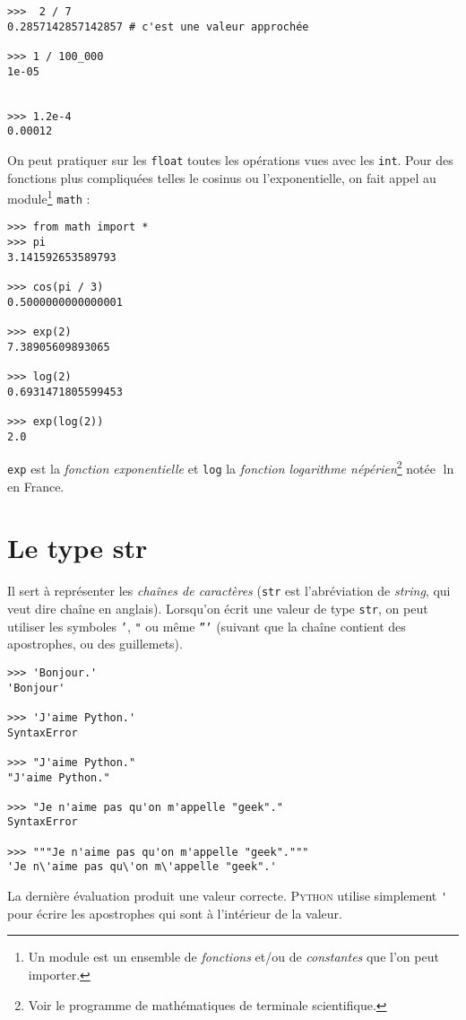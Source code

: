 \begin{pys}\begin{verbatim}
>>>  2 / 7
0.2857142857142857 # c'est une valeur approchée

>>> 1 / 100_000
1e-05


>>> 1.2e-4
0.00012
\end{verbatim}
\end{pys}

On peut pratiquer sur les \texttt{float} toutes les opérations vues avec les \texttt{int}. Pour des fonctions plus compliquées telles le cosinus ou
l'exponentielle, on fait appel au module\footnote{Un module est un ensemble de \textit{fonctions} et/ou de \textit{constantes} que l'on peut importer.}
\texttt{math} :

\begin{pys}\begin{verbatim}
>>> from math import *
>>> pi
3.141592653589793

>>> cos(pi / 3)
0.5000000000000001

>>> exp(2)
7.38905609893065

>>> log(2)
0.6931471805599453

>>> exp(log(2))
2.0
\end{verbatim}
\end{pys}

\texttt{exp} est la \textit{fonction exponentielle} et \texttt{log} la \textit{fonction logarithme népérien}\footnote{Voir le programme de mathématiques
    de terminale scientifique.} notée $\ln$ en France.



\section{Le type str}

Il sert à représenter les \textit{chaînes de caractères} (\texttt{str} est l'abréviation de \textit{string}, qui veut dire chaîne en anglais).
Lorsqu'on écrit une valeur de type \texttt{str}, on peut utiliser les symboles \texttt{'}, \texttt{"} ou même \texttt{'''} (suivant que la chaîne contient des apostrophes, ou des guillemets).

\begin{pys}\begin{verbatim}
>>> 'Bonjour.'
'Bonjour'

>>> 'J'aime Python.'
SyntaxError

>>> "J'aime Python."
"J'aime Python."

>>> "Je n'aime pas qu'on m'appelle "geek"."
SyntaxError

>>> """Je n'aime pas qu'on m'appelle "geek"."""
'Je n\'aime pas qu\'on m\'appelle "geek".'
\end{verbatim}
\end{pys}
La dernière évaluation produit une valeur correcte. \textsc{Python} utilise simplement \texttt{\'} pour écrire les apostrophes qui sont à l'intérieur de la valeur.\\



